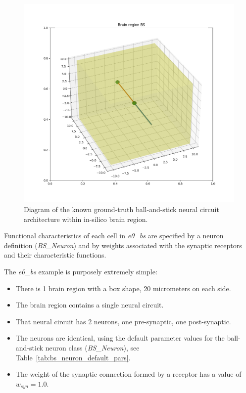 \documentclass{ldr-article}
\def\firstexp{\textit{e0\_bs} }
\begin{document}
\begin{figure}
	\centering
	\includegraphics[width=1\linewidth]{figures/e0_bs.png}
	\caption{Diagram of the known ground-truth ball-and-stick neural circuit architecture within in-silico brain region.
	}
	\label{fig:KGT-architecture}
\end{figure}

Functional characteristics of each cell in \firstexp are specified by a neuron definition (\textit{BS\_Neuron}) and by weights associated with the synaptic receptors and their characteristic functions.

The \firstexp example is purposely extremely simple:
\begin{itemize}
	\item There is 1 brain region with a box shape, 20 micrometers on each side.
	\item The brain region contains a single neural circuit.
	\item That neural circuit has 2 neurons, one pre-synaptic, one post-synaptic.
	\item The neurons are identical, using the default parameter values for the ball-and-stick neuron class (\textit{BS\_Neuron}), see Table~\ref{tab:bs_neuron_default_pars}.
	\item The weight of the synaptic connection formed by a receptor has a value of $w_{syn} = 1.0$.
\end{itemize}
\end{document}

